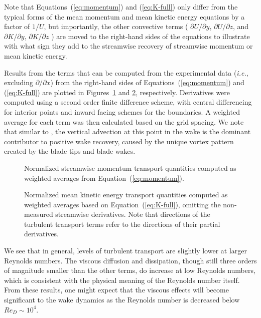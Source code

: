 Note that Equations~(\ref{eq:momentum}) and (\ref{eq:K-full}) only differ from
the typical forms of the mean momentum and mean kinetic energy equations by a
factor of $1/U$, but importantly, the other convective terms ( $\partial
U/\partial y$, $\partial U/\partial z$, and $\partial K/\partial y$, $\partial
K/\partial z$ ) are moved to the right-hand sides of the equations to illustrate
with what sign they add to the streamwise recovery of streamwise momentum or
mean kinetic energy.

Results from the terms that can be computed from the experimental data
(\emph{i.e.}, excluding $\partial / \partial x$) from the right-hand sides of
Equations~(\ref{eq:momentum}) and (\ref{eq:K-full}) are plotted in
Figures~\ref{fig:mom-bar-graph} and \ref{fig:K-bar-graph}, respectively.
Derivatives were computed using a second order finite difference scheme, with
central differencing for interior points and inward facing schemes for the
boundaries. A weighted average for each term was then calculated based on the
grid spacing. We note that similar to \cite{Bachant2015-JoT}, the vertical
advection at this point in the wake is the dominant contributor to positive wake
recovery, caused by the unique vortex pattern created by the blade tips and
blade wakes.

\begin{figure}[ht]
    \centering
    
    
    \caption{Normalized streamwise momentum transport quantities computed as
        weighted averages from Equation~(\ref{eq:momentum}).}
    
    \label{fig:mom-bar-graph}
\end{figure}

\begin{figure}[ht]
    \centering
    
    
    \caption{Normalized mean kinetic energy transport quantities computed as
        weighted averages based on Equation~(\ref{eq:K-full}), omitting the
        non-measured streamwise derivatives. Note that directions of the turbulent
        transport terms refer to the directions of their partial derivatives.}
    
    \label{fig:K-bar-graph}
\end{figure}

We see that in general, levels of turbulent transport are slightly lower at
larger Reynolds numbers. The viscous diffusion and dissipation, though still
three orders of magnitude smaller than the other terms, do increase at low
Reynolds numbers, which is consistent with the physical meaning of the Reynolds
number itself. From these results, one might expect that the viscous effects
will become significant to the wake dynamics as the Reynolds number is decreased
below $Re_D \sim 10^4$.

